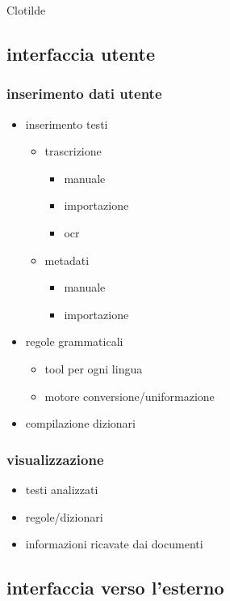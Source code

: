 Clotilde

\subsection{interfaccia utente}

\subsubsection{inserimento dati utente}

\begin{itemize}
\item inserimento testi
  \begin{itemize}
  \item trascrizione
    \begin{itemize}
    \item manuale
    \item importazione
    \item ocr
    \end{itemize}
  \item metadati
    \begin{itemize}
    \item manuale
    \item importazione
    \end{itemize}
  \end{itemize}
\item regole grammaticali
  \begin{itemize}
  \item tool per ogni lingua
  \item motore conversione/uniformazione
  \end{itemize}
\item compilazione dizionari
\end{itemize}

\subsubsection{visualizzazione}

\begin{itemize}
\item testi analizzati
\item regole/dizionari
\item informazioni ricavate dai documenti
\end{itemize}

\subsection{interfaccia verso l'esterno}


